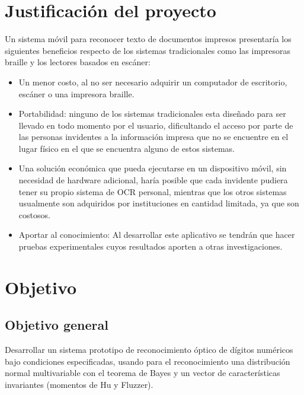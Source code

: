 \documentclass[a4paper, 11pt, oneside]{report}
\begin{document}
\section{Justificación del proyecto}

Un sistema móvil para reconocer texto de documentos impresos presentaría los siguientes beneficios respecto de los sistemas tradicionales como las impresoras braille y los lectores basados en escáner:

	\begin{itemize} 

	\item Un menor costo, al no ser necesario adquirir un computador de escritorio, escáner o una impresora braille.

	\item Portabilidad: ninguno de los sistemas tradicionales esta diseñado para ser llevado en todo momento por el usuario, dificultando el acceso por parte de las personas invidentes a la información impresa que no se encuentre en el lugar físico en el que se encuentra alguno de estos sistemas.
	
	\item Una solución económica que pueda ejecutarse en un dispositivo móvil, sin necesidad de hardware adicional, haría posible que cada invidente pudiera tener su propio sistema de OCR personal, mientras que los otros sistemas usualmente son adquiridos por instituciones en cantidad limitada, ya que son costosos.

	\item Aportar al conocimiento: Al desarrollar este aplicativo se tendrán que hacer pruebas experimentales cuyos resultados aporten a otras investigaciones.

	\end{itemize}
	
\section{Objetivo}
\label{sect:objective}
	
\subsection{Objetivo general}

Desarrollar un sistema prototipo de reconocimiento óptico de dígitos numéricos bajo condiciones especificadas, usando para el reconocimiento una distribución normal multivariable con el teorema de Bayes y un vector de características invariantes (momentos de Hu y Fluzzer).
\end{document}
